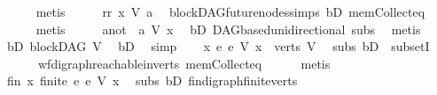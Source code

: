 \begin{isabellebody}
\ \ \ \ \isamarkupfalse%
\ metis\isanewline
\ \ \isamarkupfalse%
\ \isamarkupfalse%
\ rr{\isacharcolon}{\kern0pt}\ {\isachardoublequoteopen}x\ {\isasymrightarrow}\isactrlsup {\isacharplus}{\kern0pt}\isactrlbsub V\isactrlesub \ a{\isachardoublequoteclose}\ \isamarkupfalse%
\ blockDAG{\isachardot}{\kern0pt}future{\isacharunderscore}{\kern0pt}nodes{\isachardot}{\kern0pt}simps\ bD\ mem{\isacharunderscore}{\kern0pt}Collect{\isacharunderscore}{\kern0pt}eq\isanewline
\ \ \ \ \isamarkupfalse%
\ metis\isanewline
\ \ \isamarkupfalse%
\ \isamarkupfalse%
\ a{\isacharunderscore}{\kern0pt}not{\isacharcolon}{\kern0pt}\ {\isachardoublequoteopen}{\isasymnot}\ a\ {\isasymrightarrow}\isactrlsup {\isacharasterisk}{\kern0pt}\isactrlbsub V\isactrlesub \ x{\isachardoublequoteclose}\ \isamarkupfalse%
\ bD\ DAGbased{\isachardot}{\kern0pt}unidirectional\ subs\ \isamarkupfalse%
\ metis\isanewline
\ \ \isamarkupfalse%
\ bD{}{\isacharcolon}{\kern0pt}\ {\isachardoublequoteopen}blockDAG\ V{\isachardoublequoteclose}\ \isamarkupfalse%
\ bD\ \isamarkupfalse%
\ simp\isanewline
\ \ \isamarkupfalse%
\ {\isachardoublequoteopen}{\isasymforall}x{\isachardot}{\kern0pt}\ {\isacharbraceleft}{\kern0pt}e{\isachardot}{\kern0pt}\ e\ {\isasymrightarrow}\isactrlsup {\isacharasterisk}{\kern0pt}\isactrlbsub V\isactrlesub \ x{\isacharbraceright}{\kern0pt}\ {\isasymsubseteq}\ verts\ V{\isachardoublequoteclose}\ \isamarkupfalse%
\ subs\ bD{}\ \ subsetI\isanewline
\ \ \ \ \ \ wf{\isacharunderscore}{\kern0pt}digraph{\isachardot}{\kern0pt}reachable{\isacharunderscore}{\kern0pt}in{\isacharunderscore}{\kern0pt}verts{\isacharparenleft}{\kern0pt}{}{\isacharparenright}{\kern0pt}\ mem{\isacharunderscore}{\kern0pt}Collect{\isacharunderscore}{\kern0pt}eq\isanewline
\ \ \ \ \isamarkupfalse%
\ metis\ \isanewline
\ \ \isamarkupfalse%
\ \isamarkupfalse%
\ fin{\isacharcolon}{\kern0pt}\ {\isachardoublequoteopen}{\isasymforall}x{\isachardot}{\kern0pt}\ finite\ {\isacharbraceleft}{\kern0pt}e{\isachardot}{\kern0pt}\ e\ {\isasymrightarrow}\isactrlsup {\isacharasterisk}{\kern0pt}\isactrlbsub V\isactrlesub \ x{\isacharbraceright}{\kern0pt}{\isachardoublequoteclose}\ \isamarkupfalse%
\ subs\ bD{}\ fin{\isacharunderscore}{\kern0pt}digraph{\isachardot}{\kern0pt}finite{\isacharunderscore}{\kern0pt}verts\ \isanewline

\end{isabellebody}
